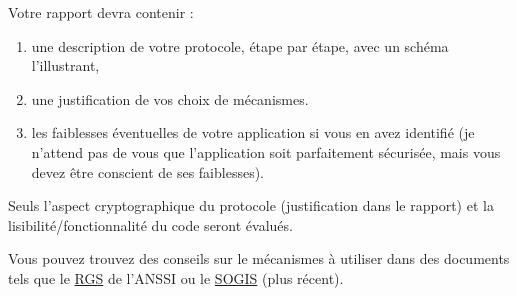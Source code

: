 \documentclass[french,a4paper,11pt]{exam}
\begin{document}
    \vspace*{0.5cm}

    \noindent Votre rapport devra contenir :
    \begin{enumerate}
        \item une description de votre protocole, étape par étape, avec un schéma l'illustrant, 
        \item une justification de vos choix de mécanismes.
        \item les faiblesses éventuelles de votre application si vous en avez identifié (je n'attend pas de vous que l'application soit parfaitement sécurisée, mais vous devez être conscient de ses faiblesses).
    \end{enumerate}

    \noindent Seuls l'aspect cryptographique du protocole (justification dans le rapport) et la lisibilité/fonctionnalité du code seront évalués.

    Vous pouvez trouvez des conseils sur le mécanismes à utiliser dans des documents tels que le \href{https://www.ssi.gouv.fr/administration/reglementation/confiance-numerique/le-referentiel-general-de-securite-rgs/liste-des-documents-constitutifs-du-rgs-v-2-0/}{RGS} de l'ANSSI ou le \href{https://www.sogis.eu/uk/supporting_doc_en.html}{SOGIS} (plus récent).

	
\end{document}

